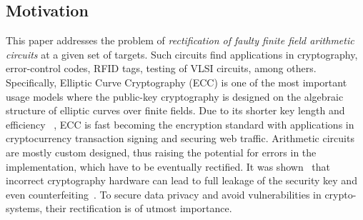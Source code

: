 {\red
\subsection{Motivation}
This paper addresses the problem of {\it rectification
of faulty finite field arithmetic circuits} at a given set of
targets. Such circuits find applications in cryptography,
error-control codes, RFID tags, testing of VLSI circuits, among 
others. Specifically, Elliptic Curve Cryptography (ECC) is one of 
the most important usage models where the public-key cryptography 
is designed on the algebraic structure of elliptic curves over 
finite fields. Due to its shorter key length and efficiency ~\cite{ecc_app:2016}, 
ECC is fast becoming the encryption standard with applications 
in cryptocurrency transaction signing and securing web traffic.
Arithmetic circuits are mostly custom designed, thus 
raising the potential for errors in the implementation, 
which have to be eventually rectified. 
It was shown~\cite{crypto:bug_attacks} that incorrect cryptography 
hardware can lead to full leakage of the security key and even
counterfeiting~\cite{crypto:counterfeit}.
To secure data privacy and avoid vulnerabilities in crypto-systems, their
rectification is of utmost importance.}




